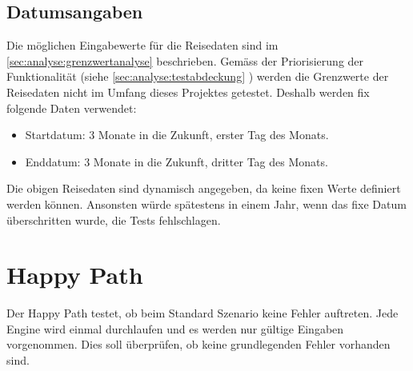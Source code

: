\subsection{Datumsangaben}
Die möglichen Eingabewerte für die Reisedaten sind im \cref{sec:analyse:grenzwertanalyse}  beschrieben.
Gemäss der Priorisierung der Funktionalität (siehe  \cref{sec:analyse:testabdeckung} ) werden die Grenzwerte der Reisedaten nicht im Umfang dieses Projektes getestet. Deshalb werden fix folgende Daten verwendet:

\begin{itemize}
\item Startdatum: 3 Monate in die Zukunft, erster Tag des Monats.
\item Enddatum: 3 Monate in die Zukunft, dritter Tag des Monats.
\end{itemize}
\vspace{0 mm}
Die obigen Reisedaten sind dynamisch angegeben, da keine fixen Werte definiert werden können. Ansonsten würde spätestens in einem Jahr, wenn das fixe Datum überschritten wurde, die Tests fehlschlagen.

\section{Happy Path}
Der Happy Path testet, ob beim Standard Szenario keine Fehler auftreten. Jede Engine wird einmal durchlaufen und es werden nur gültige Eingaben vorgenommen. Dies soll überprüfen, ob keine grundlegenden Fehler vorhanden sind.







